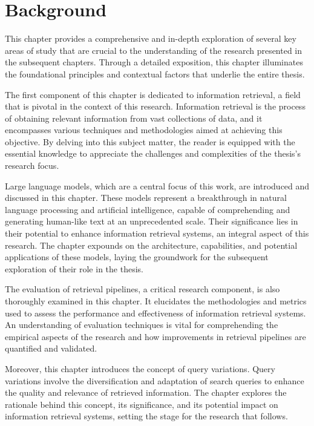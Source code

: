 \chapter{Background}
This chapter provides a comprehensive and in-depth exploration of several key areas of study that are crucial to the understanding of the research presented in the subsequent chapters. Through a detailed exposition, this chapter illuminates the foundational principles and contextual factors that underlie the entire thesis.

The first component of this chapter is dedicated to information retrieval, a field that is pivotal in the context of this research. Information retrieval is the process of obtaining relevant information from vast collections of data, and it encompasses various techniques and methodologies aimed at achieving this objective. By delving into this subject matter, the reader is equipped with the essential knowledge to appreciate the challenges and complexities of the thesis's research focus.

Large language models, which are a central focus of this work, are introduced and discussed in this chapter. These models represent a breakthrough in natural language processing and artificial intelligence, capable of comprehending and generating human-like text at an unprecedented scale. Their significance lies in their potential to enhance information retrieval systems, an integral aspect of this research. The chapter expounds on the architecture, capabilities, and potential applications of these models, laying the groundwork for the subsequent exploration of their role in the thesis.

The evaluation of retrieval pipelines, a critical research component, is also thoroughly examined in this chapter. It elucidates the methodologies and metrics used to assess the performance and effectiveness of information retrieval systems. An understanding of evaluation techniques is vital for comprehending the empirical aspects of the research and how improvements in retrieval pipelines are quantified and validated.

Moreover, this chapter introduces the concept of query variations. Query variations involve the diversification and adaptation of search queries to enhance the quality and relevance of retrieved information. The chapter explores the rationale behind this concept, its significance, and its potential impact on information retrieval systems, setting the stage for the research that follows.




